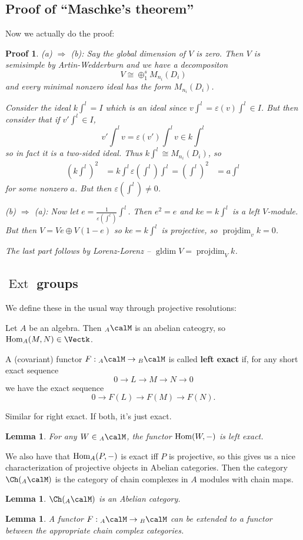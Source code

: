 \documentclass[12pt]{article}
\theoremstyle{break}
\theoremstyle{nonumberbreak}
\theoremstyle{changebreak}
\newtheorem{lem}[thm]{Lemma}
\theoremstyle{break}
\theoremstyle{nonumberbreak}
\newtheorem{prf}{Proof}
\theoremstyle{nonumberplain}
\theoremstyle{change}
\DeclareMathOperator{\Ext}{Ext}
\DeclareMathOperator{\gldim}{gldim}
\DeclareMathOperator{\projdim}{projdim}
\newcommand*{\Hom}{\ensuremath\text{Hom}}
\begin{document}
\subsection{Proof of ``Maschke's theorem''}
Now we actually do the proof:
\begin{prf}
	(a) $\Rightarrow$ (b): Say the global dimension of $V$ is zero. Then $V$ is semisimple by Artin-Wedderburn and we have a decompositon
	\[V\cong \oplus_1^s M_{n_i}(D_i)\]
	and every minimal nonzero ideal has the form $M_{n_i}(D_i)$.

	Consider the ideal $k\int^l=I$ which is an ideal since $v\int^l=\varepsilon(v)\int^l\in I$. But then consider that if $v'\int^l\in I$, 
	\[v'\int^l v=\varepsilon(v')\int^l v\in k\int^l\]
	so in fact it is a two-sided ideal. Thus $k\int^l\cong M_{n_i}(D_i)$, so 
	\begin{align*}
		(k\int^l)^2&=k\int^l
		\varepsilon(\int^l)\int^l=(\int^l)^2&=a\int^l
	\end{align*}
	for some nonzero $a$. But then $\varepsilon(\int^l)\ne 0$.

	(b) $\Rightarrow$ (a): Now let $e=\frac{1}{\varepsilon(\int^l)}\int^l$. Then $e^2=e$ and $ke=k\int^l$ is a left $V$-module.
	But then $V=Ve\oplus V(1-e)$ so $ke=k\int^l$ is projective, so $\projdim_v k=0$.

	The last part follows by Lorenz-Lorenz -- $\gldim V=\projdim_V k$.
\end{prf}

\subsection{$\Ext$ groups}
We define these in the usual way through projective resolutions:

Let $A$ be an algebra. Then $_A\calM$ is an abelian cateogry, so $\Hom_A(M,N)\in\Vectk$.
\begin{defn}
	A (covariant) functor $F:{_A\calM}\to{_B\calM}$ is called \textbf{left exact} if, for any short exact sequence
	\[0\to L\to M\to N\to 0\]
	we have the exact sequence
	\[0\to F(L)\to F(M)\to F(N).\]

	Similar for right exact. If both, it's just exact.
\end{defn}
\begin{lem}
	For any $W\in{_A\calM}$, the functor $\Hom(W,-)$ is left exact.
\end{lem}
We also have that $\Hom_A(P,-)$ is exact iff $P$ is projective, so this gives us a nice characterization of projective objects in Abelian categories.
Then the category $\Ch({_A\calM})$ is the category of chain complexes in $A$ modules with chain maps.
\begin{lem}
	$\Ch({_A\calM})$ is an Abelian category.
\end{lem}
\begin{lem}
	A functor $F:{_A\calM}\to{_B\calM}$ can be extended to a functor between the appropriate chain complex categories.
\end{lem}
\end{document}
